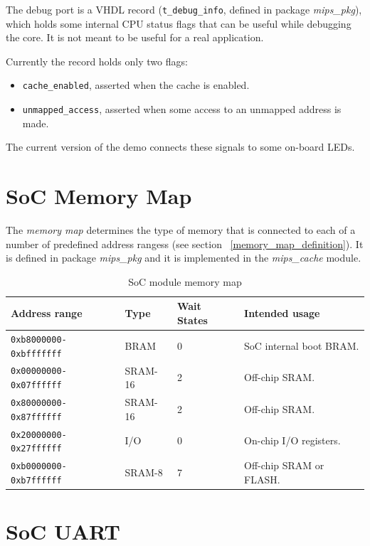     The debug port is a VHDL record (\texttt{t\_debug\_info}, defined in 
    package \emph{mips\_pkg}), which holds some internal CPU status flags that 
    can be useful while debugging the core. It is not meant to be useful for 
    a real application.
    
    Currently the record holds only two flags:
    
    \begin{itemize}
    \item \texttt{cache\_enabled}, asserted when the cache is enabled.
    \item \texttt{unmapped\_access}, asserted when some access to an unmapped 
    address is made.
    \end{itemize}

    The current version of the demo connects these signals to some on-board 
    LEDs. 

    
\section{SoC Memory Map}
\label{soc_memory_map}    
    
    The \emph{memory map} determines the type of memory that is connected to 
    each of a number of predefined address rangess (see section 
    ~\ref{memory_map_definition}).
    It is defined in package \emph{mips\_pkg} and it is implemented in the 
    \emph{mips\_cache} module.
 
\begin{table}[h]
\caption{SoC module memory map\label{tab_soc_memory_map}}
\begin{tabularx}{\textwidth}{ lll|X }
\toprule
Address range & Type & Wait States & Intended usage \\
\midrule
\texttt{0xb8000000-0xbfffffff}   & BRAM    & 0  & SoC internal boot BRAM. \\
\midrule
\texttt{0x00000000-0x07ffffff}   & SRAM-16 & 2  & Off-chip SRAM. \\
\texttt{0x80000000-0x87ffffff}   & SRAM-16 & 2  & Off-chip SRAM. \\
\texttt{0x20000000-0x27ffffff}   & I/O     & 0  & On-chip I/O registers. \\
\texttt{0xb0000000-0xb7ffffff}   & SRAM-8  & 7  & Off-chip SRAM or FLASH. \\
\bottomrule
\end{tabularx}
\end{table}   


\section{SoC UART}
\label{soc_uart}    

